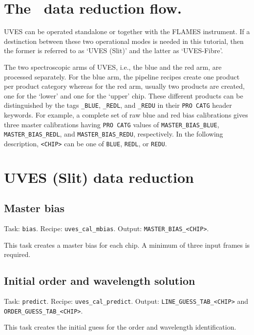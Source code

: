\section{The \instname\ data reduction flow.}
\label{sec:reduction_flow}


UVES can be operated standalone or together with the FLAMES instrument. If a
destinction between these two operational modes is needed in this tutorial, then
the former is referred to as `UVES (Slit)' and the latter as `UVES-Fibre'. 

The two spectroscopic arms of UVES, i.e., the blue and the red arm, are processed separately. 
For the blue arm, the pipeline recipes create one product per product category whereas for the
red arm, usually two products are created, one for the `lower' and one for the `upper' chip. These
different products can be distinguished by the tags {\tt \_BLUE}, {\tt \_REDL}, and {\tt \_REDU} in their
{\tt PRO CATG} header keywords. For example, a complete set of raw blue and red bias calibrations
gives three master calibrations having {\tt PRO CATG} values of {\tt MASTER\_BIAS\_BLUE}, {\tt MASTER\_BIAS\_REDL}, and
{\tt MASTER\_BIAS\_REDU}, respectively. In the following description, {\tt <CHIP>} can be one of
{\tt BLUE}, {\tt REDL}, or {\tt REDU}.

\section{UVES (Slit) data reduction}
\subsection{Master bias}

Task: {\tt bias}. Recipe: {\tt uves\_cal\_mbias}. Output: {\tt MASTER\_BIAS\_<CHIP>}.

This task creates a master bias for each chip. A minimum of three input frames is required.

\subsection{Initial order and wavelength solution}

Task: {\tt predict}. Recipe: {\tt uves\_cal\_predict}. Output: {\tt LINE\_GUESS\_TAB\_<CHIP>} and \newline
{\tt ORDER\_GUESS\_TAB\_<CHIP>}.

This task creates the initial guess for the order and wavelength identification.


